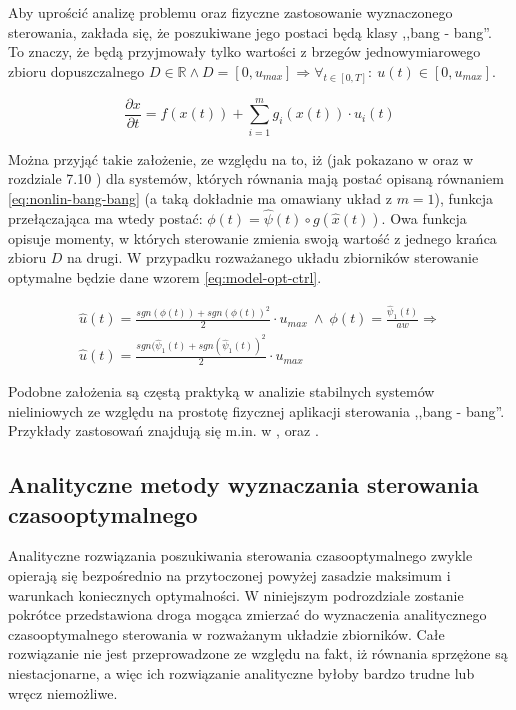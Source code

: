 Aby uprościć analizę problemu oraz fizyczne zastosowanie wyznaczonego sterowania, zakłada się, że poszukiwane jego postaci będą klasy ,,bang - bang''. To znaczy, że będą przyjmowały tylko wartości z brzegów jednowymiarowego zbioru dopuszczalnego $D \in \mathbb{R} \land D = [0, u_{max}] \Rightarrow \forall_{t \in [0, T]}:~ u(t) \in [0, u_{max}]$.

\begin{equation}\label{eq:nonlin-bang-bang}
    \frac{\partial x}{\partial t} = f(x(t)) + \sum_{i=1}^{m} g_{i}(x(t)) \cdot u_{i}(t)
\end{equation}

Można przyjąć takie założenie, ze względu na to, iż (jak pokazano w \cite{YiMa2008} oraz w rozdziale 7.10 \cite{AthansOptCtrl}) dla systemów, których równania mają postać opisaną równaniem \ref{eq:nonlin-bang-bang} (a taką dokładnie ma omawiany układ z $m = 1$), funkcja przełączająca ma wtedy postać: $\phi(t) = \hat{\psi}(t) \circ g(\hat{x}(t))$. Owa funkcja opisuje momenty, w których sterowanie zmienia swoją wartość z jednego krańca zbioru $D$ na drugi. W przypadku rozważanego układu zbiorników sterowanie optymalne będzie dane wzorem \ref{eq:model-opt-ctrl}.

\begin{equation}\label{eq:model-opt-ctrl}
\begin{array}{lr}
    \hat{u}(t) = \frac{sgn(\phi(t)) + sgn(\phi(t))^{2}}{2} \cdot u_{max} ~ \land ~ \phi(t) = \frac{\hat{\psi}_{1}(t)}{aw} \Rightarrow \\
    \hat{u}(t) = \frac{sgn(\hat{\psi}_{1}(t) + sgn(\hat{\psi}_{1}(t))^{2}}{2} \cdot u_{max}
\end{array}
\end{equation}

Podobne założenia są częstą praktyką w analizie stabilnych systemów nieliniowych ze względu na prostotę fizycznej aplikacji sterowania ,,bang - bang''. Przykłady zastosowań znajdują się m.in. w \cite{VakKek82}, \cite{BalSom83} oraz \cite{Itik2016}.

\subsection{Analityczne metody wyznaczania sterowania czasooptymalnego}
\label{sub:toc-ctrl}

Analityczne rozwiązania poszukiwania sterowania czasooptymalnego zwykle opierają się bezpośrednio na przytoczonej powyżej zasadzie maksimum i warunkach koniecznych optymalności. W niniejszym podrozdziale zostanie pokrótce przedstawiona droga mogąca zmierzać do wyznaczenia analitycznego czasooptymalnego sterowania w rozważanym układzie zbiorników. Całe rozwiązanie nie jest przeprowadzone ze względu na fakt, iż równania sprzężone są niestacjonarne, a więc ich rozwiązanie analityczne byłoby bardzo trudne lub wręcz niemożliwe.

